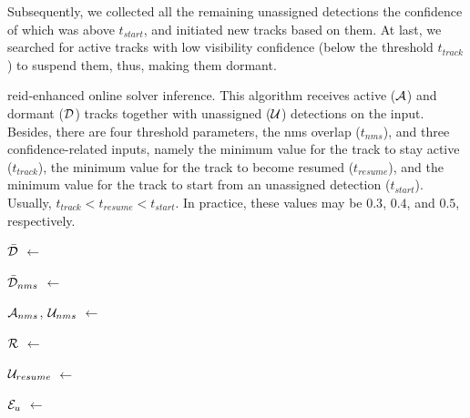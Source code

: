 Subsequently, we collected all the remaining unassigned detections the confidence of which was above $t_{start}$, and initiated new tracks based on them. At last, we searched for active tracks with low visibility confidence (below the threshold $t_{track}$) to suspend them, thus, making them dormant.

\begin{algorithm}[t]
    \caption[\Gls{reid}-enhanced online solver inference]{\Gls{reid}-enhanced online solver inference. This algorithm receives active ($\mathcal{A}$) and dormant ($\mathcal{D}$) tracks together with unassigned ($\mathcal{U}$) detections on the input. Besides, there are four threshold parameters, the \gls{nms} overlap ($t_{nms}$), and three confidence-related inputs, namely the minimum value for the track to stay active ($t_{track}$), the minimum value for the track to become resumed ($t_{resume}$), and the minimum value for the track to start from an unassigned detection ($t_{start}$). Usually, $t_{track} < t_{resume} < t_{start}$. In practice, these values may be $0.3$, $0.4$, and $0.5$, respectively.}
    \label{alg:OnlineSolverReID}
    \begin{algorithmic}[1]

        \State $\mathcal{\bar{D}}$ $\gets$ 

        \State $\mathcal{\bar{D}}_{nms}$ $\gets$ 

        \State $\mathcal{A}_{nms}$, $\mathcal{U}_{nms}$ $\gets$ 

        \State $\mathcal{R}$ $\gets$ 

        \State {}

        \State $\mathcal{U}_{resume}$ $\gets$ 

        \State $\mathcal{E}_u$ $\gets$ 


\end{algorithmic}
\end{algorithm}
